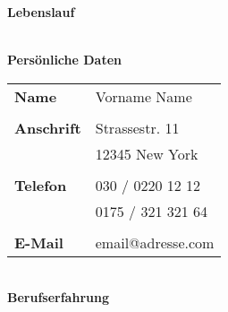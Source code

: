 \documentclass{article}
\begin{document}
\thispagestyle{empty}
{\huge\textbf{Lebenslauf}}\\
\vspace{2.5 cm} \\

\begin{minipage}[t]{0.4\textwidth}
	
{\Large \textbf{Persönliche Daten}}\\

\begin{tabular}{p{4cm}l}
\textbf{Name}								 & Vorname Name  \\
											 & \\
\textbf{Anschrift}							 & Strassestr. 11  \\
  											 & 12345 New York  \\
  											 & \\
\textbf{Telefon}							 & 030 / 0220 12 12  \\
  											 & 0175 / 321 321 64  \\
  											 & \\
\textbf{E-Mail}								 & email@adresse.com	 		
\end{tabular} \\ 	
  			
\vspace{1 cm}
{\Large \textbf{Berufserfahrung}}\\


\end{minipage}
\end{document}
